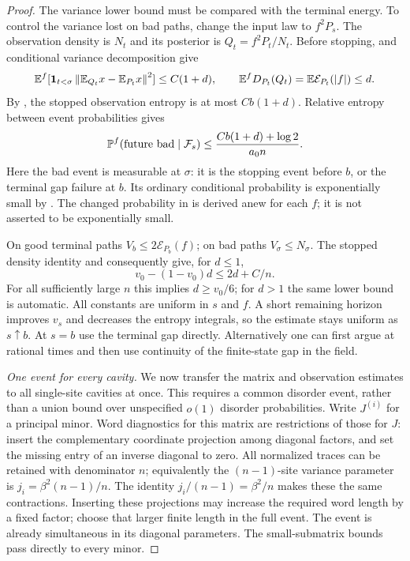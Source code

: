 \begin{proof}
The variance lower bound must be compared with the terminal energy.
To control the variance lost on bad paths, change the input law to
$f^2P_s$.  The observation density is $N_t$
and its posterior is $Q_t=f^2P_t/N_t$.  Before stopping,
 and conditional variance decomposition give
\[
 \E^{f}[\1_{t<\sigma}\norm{\E_{Q_t}x-\E_{P_t}x}^2]\le C(1+d),
 \qquad
 \E^{f}D_{P_t}(Q_t)
 =\E\mathcal E_{P_t}(|f|)\le d.
\]
By , the stopped observation entropy is
at most $Cb(1+d)$.  Relative entropy between event probabilities gives
\begin{equation}\label{eq:stat-changed-bad}
 \P^{f}(\mathrm{future\ bad}\mid\mathcal F_s)
 \le\frac{Cb(1+d)+\log2}{a_0n}.
\end{equation}
Here the bad event is measurable at $\sigma$: it is the stopping event
before $b$, or the terminal gap failure at $b$.  Its ordinary conditional
probability is exponentially small by .
The changed probability in  is derived anew for
each $f$; it is not asserted to be exponentially small.

On good terminal paths $V_b\le2\mathcal E_{P_b}(f)$; on bad paths
$V_\sigma\le N_\sigma$.  The stopped density identity and
 consequently give,
for $d\le1$,
\[
 v_0-(1-v_0)d\le2d+C/n.
\]
For all sufficiently large $n$ this implies $d\ge v_0/6$; for $d>1$
the same lower bound is automatic.  All constants are uniform in $s$ and
$f$.  A short remaining horizon improves $v_s$ and decreases the entropy
integrals, so the estimate stays uniform as $s\uparrow b$.  At $s=b$ use
the terminal gap directly.  Alternatively one can first argue at rational
times and then use continuity of the finite-state gap in the field.

\emph{One event for every cavity.}
We now transfer the matrix and observation estimates to all single-site
cavities at once.  This requires a common disorder event, rather than a
union bound over unspecified $o(1)$ disorder probabilities.  Write
$J^{(i)}$ for a principal minor.  Word diagnostics for this matrix are restrictions of those for
$J$: insert the complementary coordinate projection among diagonal factors,
and set the missing entry of an inverse diagonal to zero.  All normalized
traces can be retained with denominator $n$; equivalently the $(n-1)$-site
variance parameter is $j_i=\beta^2(n-1)/n$.  The identity
$j_i/(n-1)=\beta^2/n$ makes these the same contractions.
Inserting these projections may increase the required word length by a
fixed factor; choose that larger finite length in the full event. The
event is already simultaneous in its diagonal parameters.  The small-submatrix bounds pass directly to
every minor.


\end{proof}
